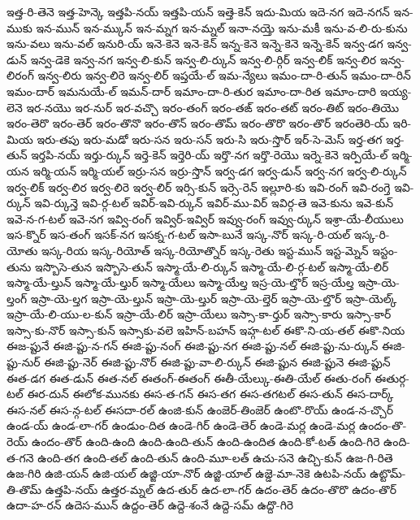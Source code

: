 {ఇత్త-రి-తెనె
ఇత్త-హెన్కె
ఇత్తపి-నయ్
ఇత్తపి-యన్
ఇత్తె-కెన్
ఇదు-మియ
ఇదె-నగ
ఇదె-నగన్
ఇన-ముకు
ఇన-మున్
ఇన-మ్కున్
ఇన-మ్నగ
ఇన-మ్నల్
ఇనా-నయ్తె
ఇను-మకీ
ఇను-వ-లి-రు-కును
ఇను-వలు
ఇను-వల్
ఇనురి-య్
ఇనె-కెనె
ఇనె-కెన్
ఇన్న-కెనె
ఇన్నె-కెనె
ఇన్నె-కెన్
ఇన్వ-డగ
ఇన్వ-డున్
ఇన్వ-డెకె
ఇన్వ-నగ
ఇన్వ-లి-కున్
ఇన్వ-లి-ర్కున్
ఇన్వ-లి-ర్గిర్
ఇన్వ-లిక్
ఇన్వ-లిర
ఇన్వ-లిరంగ్
ఇన్వ-లిరు
ఇన్వ-లిరె
ఇన్వ-లిర్
ఇప్తయే-ల్
ఇమ-న్యేలు
ఇమం-దా-రి-తున్
ఇమం-దా-రిన్
ఇమం-దార్
ఇమనుయే-ల్
ఇమన్-దార్
ఇమాం-దా-రి-తుర
ఇమాం-దా-రిత
ఇమాం-దారి
ఇయ్య-లెనె
ఇర-నయొ
ఇర-నుర్
ఇర-వచ్చొ
ఇరం-తంగ్
ఇరం-తఙ్
ఇరం-తట్
ఇరం-తిట్
ఇరం-తియొ
ఇరం-తెరొ
ఇరం-తెర్
ఇరం-తొనొ
ఇరం-తొన్
ఇరం-తొమ్
ఇరం-తొరొ
ఇరం-తొర్
ఇరంతెరి-య్
ఇరి-మియ
ఇరు-తపు
ఇరు-మడో
ఇరు-సన
ఇరు-సన్
ఇరు-సి
ఇరు-స్తొర్
ఇర్-సె-మెస్
ఇర్త-తగ
ఇర్త-తున్
ఇర్తపి-నయ్
ఇర్తు-ర్కున్
ఇర్తె-కెన్
ఇర్తెరి-య్
ఇర్తొ-నగ
ఇర్తొ-రెయొ
ఇర్నె-కెనె
ఇర్పియే-ల్
ఇర్మి-యన
ఇర్మి-యన్
ఇర్మి-యల్
ఇర్రు-సన
ఇర్రు-స్తొన్
ఇర్వ-డగ
ఇర్వ-డున్
ఇర్వ-నగ
ఇర్వ-లి-ర్కున్
ఇర్వ-లిక్
ఇర్వ-లిర
ఇర్వ-లిరె
ఇర్వ-లిర్
ఇర్సి-కున్
ఇర్సె-రెన్
ఇల్లూరి-కు
ఇవి-రంగ్
ఇవి-రంగ్తె
ఇవి-ర్కున్
ఇవి-ర్కున్తె
ఇవి-ర్గ-టల్
ఇవిర్-ఇవి-ర్కున్
ఇవిర్-ము-విర్
ఇవిర్గ-తె
ఇవె-కును
ఇవె-కున్
ఇవె-న-గ-టల్
ఇవె-నగ
ఇవ్వి-రంగ్
ఇవ్విర్-ఇవ్విర్
ఇవ్వు-రంగ్
ఇవ్వు-ర్కున్
ఇశ్రా-యే-లీయులు
ఇస-క్నొర్
ఇస-తంగ్
ఇసక్-నగ
ఇసక్న-గ-టల్
ఇసా-బునే
ఇస్క-నొర్
ఇస్క-రి-యల్
ఇస్క-రి-యోతు
ఇస్క-రియ
ఇస్క-రియోత్
ఇస్క-రియోత్నొర్
ఇస్క-రెతు
ఇస్ట-మున్
ఇస్ట-మ్నెన్
ఇస్టం-తును
ఇస్బొసె-తున
ఇస్బొసె-తున్
ఇస్మా-యే-లి-ర్కున్
ఇస్మా-యే-లి-ర్గ-టల్
ఇస్మా-యే-లిర్
ఇస్మా-యే-ల్తున్
ఇస్మా-యే-ల్తుర్
ఇస్మా-యేలు
ఇస్మా-యేల్త
ఇస్ర-యె-ల్తొర్
ఇస్ర-యేల్త
ఇస్రా-యె-ల్తంగ్
ఇస్రా-యె-ల్తగ
ఇస్రా-యె-ల్తున్
ఇస్రా-యె-ల్తుర్
ఇస్రా-యె-ల్తెర్
ఇస్రా-యె-ల్తొర్
ఇస్రా-యెల్క్
ఇస్రా-యే-లి-యు-ల-కున్
ఇస్రా-యే-లిర్
ఇస్రా-యేలు
ఇస్సా-కా-ర్తుర్
ఇస్సా-కారు
ఇస్సా-కార్
ఇస్సా-కు-నొర్
ఇస్సా-కున్
ఇస్సాకు-వలె
ఇహిన్-బహన్
ఇహ్గ-టల్
ఈకొ-ని-య-తల్
ఈకొ-నియ
ఈజ-ప్టునే
ఈజి-ప్టు-న-గన్
ఈజి-ప్టు-నంగ్
ఈజి-ప్టు-నగ
ఈజి-ప్టు-నల్
ఈజి-ప్టు-ను-ర్కున్
ఈజి-ప్టు-నుర్
ఈజి-ప్టు-నెర్
ఈజి-ప్టు-నొర్
ఈజి-ప్టు-వా-లి-ర్కున్
ఈజి-ప్టున
ఈజి-ప్టునె
ఈజి-ప్టున్
ఈత-డగ
ఈత-డున్
ఈత-నల్
ఈతంగ్-ఈతంగ్
ఈతీ-యేల్కు-ఈతి-యేల్
ఈతు-రంగ్
ఈతుర్గ-టల్
ఈర-దున్
ఈలోక-మునకు
ఈస-త-గన్
ఈస-తగ
ఈస-తగటల్
ఈస-తున్
ఈస-దార్క్
ఈస-నల్
ఈస-న్గ-టల్
ఈసదా-రల్
ఉంజి-కున్
ఉంజెర్-తింజెర్
ఉంటొ-రొయ్
ఉండ-న-చ్చొర్
ఉండ-య్
ఉండ-లా-గర్
ఉండుం-దిత
ఉండె-గిర్
ఉండె-తెర్
ఉండె-మర్ల
ఉండె-మర్ల
ఉందం-తొ-రెయ్
ఉందం-తొర్
ఉంది-ఉంది
ఉంది-ఉంది-తున్
ఉంది-ఉందిత
ఉంది-కో-టత్
ఉంది-గిరె
ఉంది-త-గనె
ఉంది-తగ
ఉంది-తల్
ఉంది-తున్
ఉంది-మూ-లత్
ఉచు-సనె
ఉచ్చి-కున్
ఉజ-గి-రితె
ఉజ-గిరి
ఉజి-యన్
ఉజి-యల్
ఉజ్జి-యా-నొర్
ఉజ్జి-యాల్
ఉజ్డె-మా-నెకె
ఉటపి-నయ్
ఉట్టొమ్-తి-తొమ్
ఉత్తపి-నయ్
ఉత్తర-మ్నల్
ఉద-తుర్
ఉద-లా-గర్
ఉదం-తెర్
ఉదం-తొరొ
ఉదం-తొర్
ఉదా-హ-రన్
ఉదెస-మున్
ఉద్దం-తెర్
ఉద్దె-శంనే
ఉద్దె-సమ్
ఉద్దొ-గిరె
}
